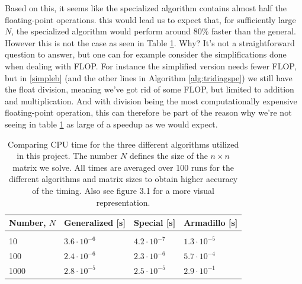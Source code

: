 \documentclass[12pt]{article}
\numberwithin{figure}{section}
\numberwithin{table}{section}
\begin{document}
\noindent Based on this, it seems like the specialized algorithm contains almost half the floating-point operations. this would lead us to expect that, for sufficiently large $N$, the specialized algorithm would perform around 80\% faster than the general. However this is not the case as seen in Table \ref{CPU}. Why? It's not a straightforward question to answer, but one can for example consider the simplifications done when dealing with FLOP. For instance the simplified version needs fewer FLOP, but in \eqref{simpleb} (and the other lines in Algorithm \ref{alg:tridiagspe}) we still have the float division, meaning we've got rid of some FLOP, but limited to addition and multiplication. And with division being the most computationally expensive floating-point operation, this can therefore be part of the reason why we're not seeing in table \ref{CPU} as large of a speedup as we would expect. \\

\begin{table}[ht]
\begin{center}
\label{CPU}
  \begin{tabular}{| l | l | l | l |}
  \hline
    Number, $N$ &  Generalized [s] & Special [s] & Armadillo [s]\\[0.10cm]\hline\hline
     & & & \\
     10 & $3.6\cdot10^{-6}$ & $4.2\cdot10^{-7}$ & $1.3\cdot10^{-5}$\\[0.10cm]
    100 & $2.4\cdot10^{-6}$ & $2.3\cdot10^{-6}$& $5.7\cdot10^{-4}$\\[0.10cm]
     1000 & $2.8\cdot10^{-5}$& $2.5\cdot10^{-5}$& $2.9\cdot10^{-1}$\\[0.10cm]
     \hline
  \end{tabular}
\end{center}
\caption{Comparing CPU time for the three different algorithms utilized in this project. The number $N$ defines the size of the $n\times n$ matrix we solve. All times are averaged over 100 runs for the different algorithms and matrix sizes to obtain higher accuracy of the timing. Also see figure 3.1 for a more visual representation.}
\end{table}
\end{document}
